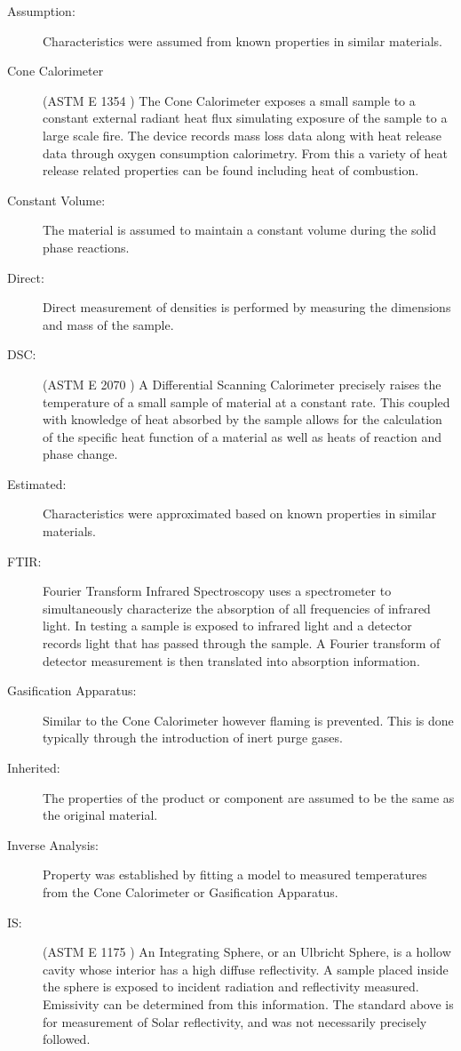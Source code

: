 \begin{description}
\item[Assumption:]  Characteristics were assumed from known properties in similar materials.
\item[Cone Calorimeter] (ASTM E 1354 \cite{conecal}) The Cone Calorimeter exposes a small sample to a constant external radiant heat flux simulating exposure of the sample to a large scale fire. The device records mass loss data along with heat release data through oxygen consumption calorimetry. From this a variety of heat release related properties can be found including heat of combustion.
\item[Constant Volume:] The material is assumed to maintain a constant volume during the solid phase reactions.
\item[Direct:]  Direct measurement of densities is performed by measuring the dimensions and mass of the sample.
\item[DSC:] (ASTM E 2070 \cite{diffscancal}) A Differential Scanning Calorimeter precisely raises the temperature of a small sample of material at a constant rate. This coupled with knowledge of heat absorbed by the sample allows for the calculation of the specific heat function of a material as well as heats of reaction and phase change.
\item[Estimated:] Characteristics were approximated based on known properties in similar materials.
\item[FTIR:] Fourier Transform Infrared Spectroscopy uses a spectrometer to simultaneously characterize the absorption of all frequencies of infrared light. In testing a sample is exposed to infrared light and a detector records light that has passed through the sample. A Fourier transform of detector measurement is then translated into absorption information.
\item[Gasification Apparatus:] Similar to the Cone Calorimeter however flaming is prevented. This is done typically through the introduction of inert purge gases.
\item[Inherited:] The properties of the product or component are assumed to be the same as the original material.
\item[Inverse Analysis:] Property was established by fitting a model to measured temperatures from the Cone Calorimeter or Gasification Apparatus.
\item[IS:] (ASTM E 1175 \cite{intgsphere}) An Integrating Sphere, or an Ulbricht Sphere, is a hollow cavity whose interior has a high diffuse reflectivity. A sample placed inside the sphere is exposed to incident radiation and reflectivity measured. Emissivity can be determined from this information. The standard above is for measurement of Solar reflectivity, and was not necessarily precisely followed.

\end{description}
